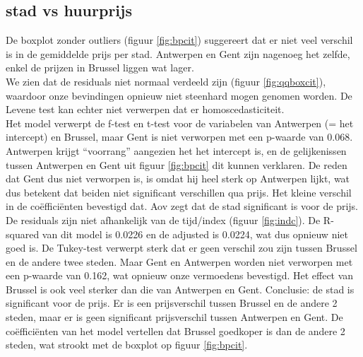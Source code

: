 \documentclass[a4paper,kulak]{kulakarticle} %
\begin{document}
\subsection{stad vs huurprijs}
\label{sec:stadvsprijs}
De boxplot zonder outliers (figuur \ref{fig:bpcit}) suggereert  dat er niet veel verschil is in de gemiddelde prijs per stad. Antwerpen en Gent zijn nagenoeg het zelfde, enkel de prijzen in Brussel liggen wat lager. \\

We zien dat de residuals niet normaal verdeeld zijn (figuur \ref{fig:qqboxcit}), waardoor onze bevindingen opnieuw niet steenhard mogen genomen worden. De Levene test kan echter niet verwerpen dat er homoscedasticiteit.\\
Het model verwerpt de f-test en t-test voor de variabelen van Antwerpen (= het intercept) en Brussel, maar Gent is niet verworpen  met een p-waarde van 0.068. 
Antwerpen krijgt ``voorrang'' aangezien het het intercept is, en de gelijkenissen tussen Antwerpen en Gent uit figuur \ref*{fig:bpcit} dit kunnen verklaren. 
De reden dat Gent dus niet verworpen is, is omdat hij heel sterk op Antwerpen lijkt, wat dus betekent dat beiden niet significant verschillen qua prijs.
Het kleine verschil in de coëfficiënten bevestigd dat.
Aov zegt dat de stad significant is voor de prijs. 
De residuals zijn niet afhankelijk van de tijd/index (figuur \ref{fig:indc}).
De R-squared van dit model is 0.0226 en de adjusted is 0.0224, wat dus opnieuw niet goed is.
De Tukey-test verwerpt sterk dat er geen verschil zou zijn tussen Brussel en de andere twee steden. Maar Gent en Antwerpen worden niet verworpen  met een p-waarde van 0.162, wat opnieuw onze vermoedens bevestigd. 
Het effect van Brussel is ook veel sterker dan die van Antwerpen en Gent. 
Conclusie: de stad is significant voor de prijs. Er is een prijsverschil tussen Brussel en de andere 2 steden, maar er is geen significant prijsverschil tussen Antwerpen en Gent.
De coëfficiënten van het model vertellen dat Brussel goedkoper is dan de andere 2 steden, wat strookt met de boxplot op figuur \ref{fig:bpcit}.
\end{document}
